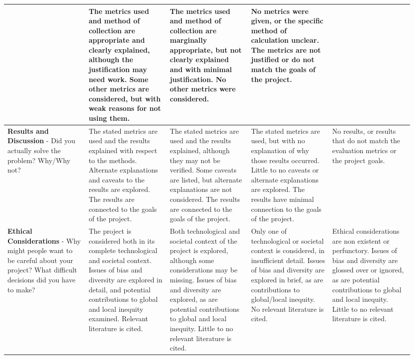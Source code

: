 \documentclass[10pt,twocolumn]{article}
\begin{document}
\begin{landscape}
\begin{longtable}{p{0.19\linewidth} | p{0.19\linewidth} | p{0.19\linewidth} | p{0.19\linewidth} | p{0.19\linewidth}}
    & \cellcolor{good} The metrics used and method of collection are appropriate and clearly explained, although the justification may need work. Some other metrics are considered, but with weak reasons for not using them.
    & \cellcolor{marginal} The metrics used and method of collection are marginally appropriate, but not clearly explained and with minimal justification. No other metrics were considered.
    & \cellcolor{unacceptable} No metrics were given, or the specific method of calculation unclear. The metrics are not justified or do not match the goals of the project. \\
\midrule
\textbf{Results and Discussion} - Did you actually solve the problem? Why/Why not?
    & \cellcolor{excellent} The stated metrics are used and the results explained with respect to the methods. Alternate explanations and caveats to the results are explored. The results are connected to the goals of the project.
    & \cellcolor{good} The stated metrics are used and the results explained, although they may not be verified. Some caveats are listed, but alternate explanations are not considered. The results are connected to the goals of the project.
    & \cellcolor{marginal} The stated metrics are used, but with no explanation of why those results occurred. Little to no caveats or alternate explanations are explored. The results have minimal connection to the goals of the project.
    & \cellcolor{unacceptable} No results, or results that do not match the evaluation metrics or the project goals. \\
\midrule
\textbf{Ethical Considerations} - Why might people want to be careful about your project? What difficult decisions did you have to make?
    & \cellcolor{excellent} The project is considered both in its complete technological and societal context. Issues of bias and diversity are explored in detail, and potential contributions to global and local inequity examined. Relevant literature is cited.
    & \cellcolor{good} Both technological and societal context of the project is explored, although some considerations may be missing. Issues of bias and diversity are explored, as are potential contributions to global and local inequity. Little to no relevant literature is cited.
    & \cellcolor{marginal} Only one of technological or societal context is considered, in insufficient detail. Issues of bias and diversity are explored in brief, as are contributions to global/local inequity. No relevant literature is cited. 
    & \cellcolor{unacceptable} Ethical considerations are non existent or perfunctory. Issues of bias and diversity are glossed over or ignored, as are potential contributions to global and local inequity. Little to no relevant literature is cited. \\

\end{longtable}
\end{landscape}
\end{document}
